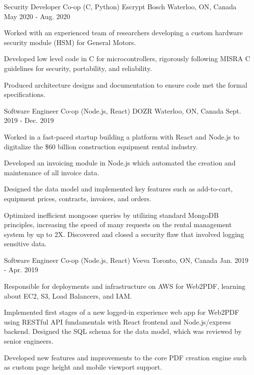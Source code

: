 \begin{cventries}
  \cventry
    {Security Developer Co-op (C, Python)} %
    {Escrypt Bosch} %
    {Waterloo, ON, Canada} %
    {May 2020 - Aug. 2020} %
    {
      \begin{cvitems} %
\item Worked with an experienced team of researchers developing a custom hardware security module (HSM) for General Motors.
\item Developed low level code in C for microcontrollers, rigorously following MISRA C guidelines for security, portability, and reliability.
\item Produced architecture designs and documentation to ensure code met the formal specifications.
      \end{cvitems}
    }

  \cventry
    {Software Engineer Co-op (Node.js, React)} %
    {DOZR} %
    {Waterloo, ON, Canada} %
    {Sept. 2019 - Dec. 2019} %
    {
      \begin{cvitems} %
\item Worked in a fast-paced startup building a platform with React and Node.js to digitalize the \$60 billion construction equipment rental industry.
\item Developed an invoicing module in Node.js which automated the creation and maintenance of all invoice data.
\item Designed the data model and implemented key features such as add-to-cart, equipment prices, contracts, invoices, and orders.
\item Optimized inefficient mongoose queries by utilizing standard MongoDB principles, increasing the speed of many requests on the rental management system by up to 2X. Discovered and closed a security flaw that involved logging sensitive data.
      \end{cvitems}
    }

  \cventry
    {Software Engineer Co-op (Node.js, React)} %
    {Veeva} %
    {Toronto, ON, Canada} %
    {Jan. 2019 - Apr. 2019} %
    {
      \begin{cvitems} %
\item Responsible for deployments and infrastructure on AWS for Web2PDF, learning about EC2, S3, Load Balancers, and IAM.
\item Implemented first stages of a new logged-in experience web app for Web2PDF using RESTful API fundamentals with React frontend and Node.js/express backend. Designed the SQL schema for the data model, which was reviewed by senior engineers.
\item Developed new features and improvements to the core PDF creation engine such as custom page height and mobile viewport support.
      \end{cvitems}
    }


\end{cventries}
